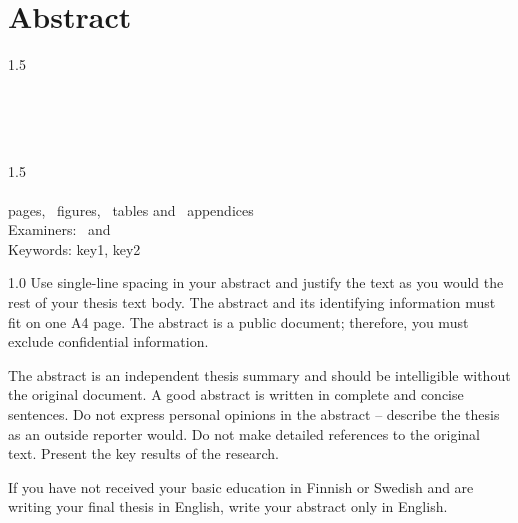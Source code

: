 \section*{Abstract}
\begin{spacing}{1.5}
	\university\\
	\school\\
	\degreeprogramme\\
\end{spacing}

\myname

\textbf{\mytitle}\\
\mysubtitle

\begin{spacing}{1.5}
	\thesistype\\
	\thesisyear\\
	\pageref{myLastPage} pages, \totalfigures~figures, \totaltables~tables and ~appendices\\
	Examiners: \examinerA~and \examinerB\\
	Keywords: key1, key2
\end{spacing}

\vspace{1em}
\begin{spacing}{1.0}
	Use single-line spacing in your abstract and justify the text as you would the rest of your thesis text body. The abstract and its identifying information must fit on one A4 page. The abstract is a public document; therefore, you must exclude confidential information.

	The abstract is an independent thesis summary and should be intelligible without the original document. A good abstract is written in complete and concise sentences. Do not express personal opinions in the abstract – describe the thesis as an outside reporter would. Do not make detailed references to the original text. Present the key results of the research.

	If you have not received your basic education in Finnish or Swedish and are writing your final thesis in English, write your abstract only in English.
\end{spacing}
\clearpage %
